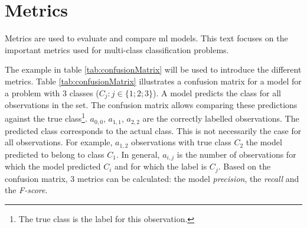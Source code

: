 \section{Metrics}
\par{Metrics are used to evaluate and compare \acrlong{ml} models.
This text focuses on the important metrics used for multi-class classification problems.
}
\par{
    The example in table \ref{tab:confusionMatrix} will be used to introduce the different metrics.
    Table \ref{tab:confusionMatrix} illustrates a confusion matrix for a model for a problem with 3 classes ($C_j:j\in \{1;2;3\}$). 
    A model predicts the class for all observations in the set.
    The confusion matrix allows comparing these predictions against the true class\footnote{The true class is the label for this observation.}.
    $a_{0,0}$, $a_{1,1}$, $a_{2,2}$ are the correctly labelled observations. 
The predicted class corresponds to the actual class.
This is not necessarily the case for all observations. For example, $a_{1,2}$ observations with true class $C_2$ the model predicted to belong to class $C_1$.
In general, $a_{i,j}$ is the number of observations for which the model predicted $C_i$ and for which the label is $C_j$.
Based on the confusion matrix, 3 metrics can be calculated: the model \textit{precision}, the \textit{recall} and the \textit{F-score}.
}
